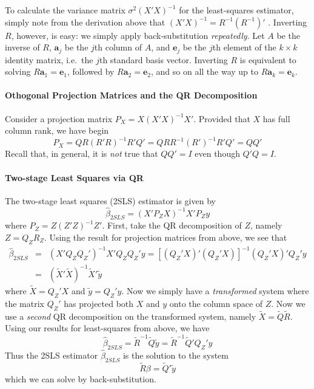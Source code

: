 \documentclass[12pt]{article}
\theoremstyle{definition}
\begin{document}
To calculate the variance matrix $\sigma^2 (X'X)^{-1}$ for the least-squares estimator, simply note from the derivation above that $(X'X)^{-1} = R^{-1} (R^{-1})'$ . Inverting $R$, however, is easy: we simply apply back-substitution \emph{repeatedly}. Let $A$ be the inverse of $R$, $\mathbf{a}_j$ be the $j$th column of $A$, and $\mathbf{e}_j$ be the $j$th element of the $k\times k$ identity matrix, i.e.\ the $j$th standard basis vector. Inverting $R$ is equivalent to solving $R \mathbf{a}_1 = \mathbf{e}_1$, followed by $R \mathbf{a}_2 = \mathbf{e}_2$, and so on all the way up to $R \mathbf{a}_k = \mathbf{e}_k$. 

\paragraph{Othogonal Projection Matrices and the QR Decomposition}
Consider a projection matrix $P_X = X (X'X)^{-1}X'$. Provided that $X$ has full column rank, we have
begin
  $$P_X  = QR(R'R)^{-1}R'Q' = QRR^{-1} (R')^{-1}R'Q' = QQ'$$
Recall that, in general, it is \emph{not} true that $QQ' = I$ even though $Q'Q = I$.

\paragraph{Two-stage Least Squares via QR} The two-stage least squares (2SLS) estimator is given by
  $$\widehat{\beta}_{2SLS} = (X' P_Z X)^{-1} X' P_Z y$$
where $P_Z = Z(Z'Z)^{-1}Z'$. First, take the QR decomposition of $Z$, namely $Z = Q_Z R_Z$. Using the result for projection matrices from above, we see that
\begin{eqnarray*}
  \widehat{\beta}_{2SLS} &=& (X' Q_Z Q_Z')^{-1} X' Q_Z Q_Z' y=\left[ (Q_Z' X)' (Q_Z' X)\right]^{-1} (Q_Z' X)' Q_Z' y\\
    &=& \left(\widetilde{X}' \widetilde{X}\right)^{-1} \widetilde{X}' \widetilde{y}
\end{eqnarray*}
where $\widetilde{X} = Q_Z' X$ and $\widetilde{y} = Q_Z' y$. Now we simply have a \emph{transformed} system where the matrix $Q_Z'$ has projected both $X$ and $y$ onto the column space of $Z$. Now we use a \emph{second} QR decomposition on the transformed system, namely $\widetilde{X} = \widetilde{Q} \widetilde{R}$. Using our results for least-squares from above, we have 
  $$\widehat{\beta}_{2SLS} = \widetilde{R}^{-1} \widetilde{Q} \widetilde{y} = \widetilde{R}^{-1} \widetilde{Q}' Q_Z' y$$
Thus the 2SLS estimator $\widehat{\beta}_{2SLS}$ is the solution to the system
  $$\widetilde{R} \beta = \widetilde{Q}' \widetilde{y}$$
which we can solve by back-substitution. 
\end{document}
